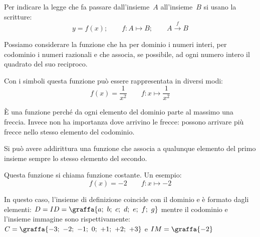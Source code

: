 Per indicare la legge che fa passare dall'insieme~\(A\) all'insieme~\(B\) 
si usano la scritture:
\[y=f(x); \qquad f:A \mapsto B; \qquad A\overset{{f}}{{\rightarrow }}B\]

\vspace{1em}
\begin{minipage}{.38\textwidth}
\begin{esempio}
Possiamo considerare la funzione che ha per dominio i numeri interi, per 
codominio i numeri razionali e che associa, se possibile, ad ogni numero 
intero il quadrato del suo reciproco.

Con i simboli questa funzione può essere rappresentata in diversi modi:
\[f(x) = \frac{1}{x^2} \qquad f: x \mapsto \frac{1}{x^2}\]
\end{esempio}
\end{minipage}
\hfill
\begin{minipage}{.60\textwidth}
\esefunz
\end{minipage}

È una funzione perché da ogni elemento del dominio parte al massimo una 
freccia. 
Invece non ha importanza dove arrivino le frecce: possono arrivare più frecce 
nello stesso elemento del codominio.

\vspace{1em}
\begin{minipage}{.38\textwidth}
\begin{esempio}
Si può avere addirittura una funzione che associa a qualunque elemento del 
primo insieme sempre lo stesso elemento del secondo.

Questa funzione si chiama funzione costante. Un esempio:
\[f(x) = -2 \qquad f: x \mapsto -2\]
\end{esempio}
\end{minipage}
\hfill
\begin{minipage}{.60\textwidth}
\funzcostante
\end{minipage}

In questo caso, l'insieme di definizione coincide con il dominio e è formato 
dagli elementi: \quad
\(D=ID=\graffa{a;~b;~c;~d;~e;~f;~g}\) mentre il codominio e l'insieme 
immagine sono rispettivamente: \quad
\(C=\graffa{-3;~-2;~-1;~0;~+1;~+2;~+3}\) \quad e \quad \(IM=\graffa{-2}\)

